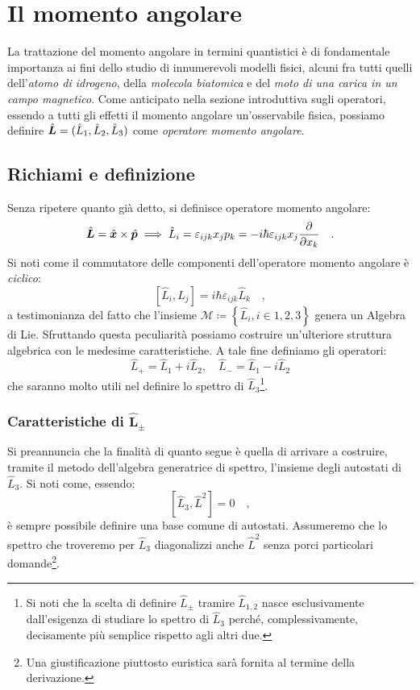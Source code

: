 
\chapter{Il momento angolare}
La trattazione del momento angolare in termini quantistici è di fondamentale importanza ai fini dello studio di innumerevoli modelli fisici, alcuni fra tutti quelli dell'\emph{atomo di idrogeno}, della \emph{molecola biatomica} e del \emph{moto di una carica in un campo magnetico}. Come anticipato nella sezione introduttiva sugli operatori, essendo a tutti gli effetti il momento angolare un'osservabile fisica, possiamo definire $\hat{\bm{L}} = (\hat{L}_1, \hat{L}_2, \hat{L}_3)$ come \emph{operatore momento angolare}. 

\section{Richiami e definizione}
Senza ripetere quanto già detto, si definisce operatore momento angolare:
\[
    \hat{\bm{L}} = \hat{\bm{x}} \times \hat{\bm{p}} \implies \hat{L}_i = \varepsilon_{ijk}x_jp_k = -i\hbar \varepsilon_{ijk} x_j \pdv{}{x_k} \quad.
\]
Si noti come il commutatore delle componenti dell'operatore momento angolare è \emph{ciclico}:
\[
    [\hat{L}_i, \hat{L}_j] = i\hbar \varepsilon_{ijk}\hat{L}_k \quad,
\]
a testimonianza del fatto che l'insieme $\mathcal{M} \coloneq \left\{ \hat{L}_i, i \in 1,2,3 \right\}$ genera un Algebra di Lie. Sfruttando questa peculiarità possiamo costruire un'ulteriore struttura algebrica con le medesime caratteristiche. A tale fine definiamo gli operatori:
\[
    \hat{L}_+ = \hat{L}_1 + i\hat{L}_2, \quad \hat{L}_- = \hat{L}_1 - i\hat{L}_2 
\]
che saranno molto utili nel definire lo spettro di $\hat{L}_3$\footnote{Si noti che la scelta di definire $\hat{L}_\pm$ tramire $\hat{L}_{1,2}$ nasce esclusivamente dall'esigenza di studiare lo spettro di $\hat{L}_3$ perché, complessivamente, decisamente più semplice rispetto agli altri due. }. 

\subsection{Caratteristiche di \texorpdfstring{$\bm{\hat{L}_{\pm}}$}{L pm}} 
Si preannuncia che la finalità di quanto segue è quella di arrivare a costruire, tramite il metodo dell'algebra generatrice di spettro, l'insieme degli autostati di $\hat{L}_3$. Si noti come, essendo:
\[
    [\hat{L}_3, \hat{L}^2] = 0 \quad,
\]
è sempre possibile definire una base comune di autostati. Assumeremo che lo spettro che troveremo per $\hat{L}_3$ diagonalizzi anche $\hat{L}^2$ senza porci particolari domande\footnote{Una giustificazione piuttosto euristica sarà fornita al termine della derivazione.}. 


